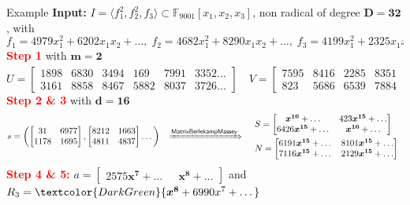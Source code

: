 \documentclass[final]{beamer}
\newlength{\twocolwid}
\begin{document}
\begin{frame}[t]
\begin{columns}[t]
\begin{column}{\twocolwid}
        \begin{alertblock}{{\sf Example}}
		\textbf{Input: }$I = \langle f_1^2, f_2^2,f_3 \rangle \subset \mathbb{F}_{9001}[x_1,x_2,x_3]$,
                {\sf non radical
                of degree $\boldsymbol{D=32}$,
                with}
		$$ f_1 = 4979x_1^2 + 6202x_1x_2 + \dots, \;
		   f_2 = 4682x_1^2 + 8290x_1x_2 + \dots, \;
		   f_3 = 4199x_1^2 + 2325x_1x_2 + \dots$$
		\textcolor{red}{\bf Step 1} {\sf with} $\boldsymbol{m = 2}$
		$$ U = \begin{bmatrix}
		1898 &6830 &3494 & 169 &7991 &3352 \dots \\
		3161 &8858 &8467 &5882 &8037 &3726 \dots
		\end{bmatrix} \quad
		V = \begin{bmatrix}
		7595 &8416 &2285 &8351 & 550 &7012 \dots \\
		823 &5686 &6539 &7884 &7105 &3427 \dots 
		\end{bmatrix}^t
		$$
		\textcolor{red}{\bf Step 2 \& 3} {\sf with} $\boldsymbol{d = 16}$
		$$ s = \left(
		\begin{bmatrix}
		31  & 6977\\
		1178& 1695
		\end{bmatrix},
		\begin{bmatrix}
		8212&1663\\
		4811&4837
		\end{bmatrix}
		\dots
		\right)\,
                ~~\xRightarrow{\mathsf{MatrixBerlekampMassey}}~~
                \begin{array}{l}
		S = \begin{bmatrix}
		\boldsymbol{x^{16}} + \dots & 423\boldsymbol{x^{15}} +\dots\\
		6426\boldsymbol{x^{15}}+ \dots & \boldsymbol{x^{16}} + \dots
		\end{bmatrix} \, \\[1em]
		N = \begin{bmatrix}
		6191\boldsymbol{x^{15}} + \dots & 8101\boldsymbol{x^{15}} + \dots\\
		7116\boldsymbol{x^{15}} + \dots & 2129\boldsymbol{x^{15}} + \dots
		\end{bmatrix}
                \end{array}
		$$
		\textcolor{red}{\bf Step 4 \& 5:}
		$        a = \begin{bmatrix}
		2575\boldsymbol{x^7}+\dots ~~&~ \boldsymbol{x^8} + \dots
		\end{bmatrix}$
                {\sf and} 
                $ R_3=\textcolor{DarkGreen}{\boldsymbol{x^{8}} + 6990x^{7}+ \dots}$\\


\end{alertblock}
\end{column}
\end{columns}
\end{frame}
\end{document}
